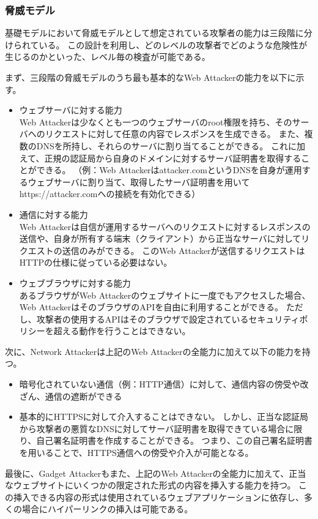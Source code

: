 \documentclass[12pt,a4paper]{jbook}
\begin{document}
\subsubsection{脅威モデル}
基礎モデルにおいて脅威モデルとして想定されている攻撃者の能力は三段階に分けられている。
この設計を利用し、どのレベルの攻撃者でどのような危険性が生じるのかといった、レベル毎の検査が可能である。

まず、三段階の脅威モデルのうち最も基本的なWeb Attackerの能力を以下に示す。
\begin{itemize}
\item ウェブサーバに対する能力 \\
Web Attackerは少なくとも一つのウェブサーバのroot権限を持ち、そのサーバへのリクエストに対して任意の内容でレスポンスを生成できる。
また、複数のDNSを所持し、それらのサーバに割り当てることができる。
これに加えて、正規の認証局から自身のドメインに対するサーバ証明書を取得することができる。
（例：Web Attackerはattacker.comというDNSを自身が運用するウェブサーバに割り当て、取得したサーバ証明書を用いてhttps://attacker.comへの接続を有効化できる）
\item 通信に対する能力 \\
Web Attackerは自信が運用するサーバへのリクエストに対するレスポンスの送信や、自身が所有する端末（クライアント）から正当なサーバに対してリクエストの送信のみができる。
このWeb Attackerが送信するリクエストはHTTPの仕様に従っている必要はない。
\item ウェブブラウザに対する能力 \\
あるブラウザがWeb Attackerのウェブサイトに一度でもアクセスした場合、Web AttackerはそのブラウザのAPIを自由に利用することができる。
ただし、攻撃者の使用するAPIはそのブラウザで設定されているセキュリティポリシーを超える動作を行うことはできない。
\end{itemize}

次に、Network Attackerは上記のWeb Attackerの全能力に加えて以下の能力を持つ。
\begin{itemize}
\item 暗号化されていない通信（例：HTTP通信）に対して、通信内容の傍受や改ざん、通信の遮断ができる
\item 基本的にHTTPSに対して介入することはできない。
しかし、正当な認証局から攻撃者の悪質なDNSに対してサーバ証明書を取得できている場合に限り、自己署名証明書を作成することができる。
つまり、この自己署名証明書を用いることで、HTTPS通信への傍受や介入が可能となる。
\end{itemize}

最後に、Gadget Attackerもまた、上記のWeb Attackerの全能力に加えて、正当なウェブサイトにいくつかの限定された形式の内容を挿入する能力を持つ。
この挿入できる内容の形式は使用されているウェブアプリケーションに依存し、多くの場合にハイパーリンクの挿入は可能である。
\end{document}
